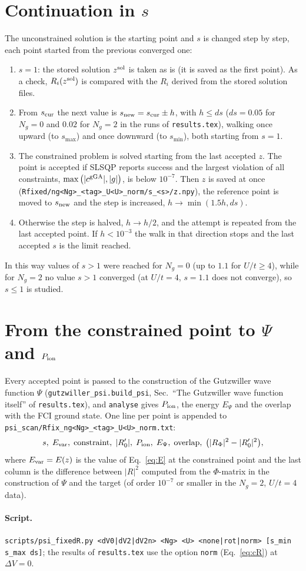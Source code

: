 \documentclass[11pt]{article}
\newcommand{\Ng}{N_g}
\newcommand{\dV}{\Delta V}
\begin{document}
\section{Continuation in $s$}
The unconstrained solution is the starting point and $s$ is changed step by step, each point started from the previous converged one:
\begin{enumerate}[leftmargin=1.5em,itemsep=1pt]
\item $s=1$: the stored solution $z^{\rm sol}$ is taken as is (it is saved as the first point). As a check, $R_i(z^{\rm sol})$ is compared with the $R_i$ derived from the stored solution files.
\item From $s_{\rm cur}$ the next value is $s_{\rm new}=s_{\rm cur}\pm h$, with $h\le ds$ ($ds=0.05$ for $\Ng=0$ and $0.02$ for $\Ng=2$ in the runs of \texttt{results.tex}), walking once upward (to $s_{\max}$) and once downward (to $s_{\min}$), both starting from $s=1$.
\item The constrained problem is solved starting from the last accepted $z$. The point is accepted if SLSQP reports success and the largest violation of all constraints, $\max\big(|c^{\rm gGA}|,|g|\big)$, is below $10^{-7}$. Then $z$ is saved at once (\texttt{Rfixed/ng<Ng>\_<tag>\_U<U>\_norm/s\_<s>/z.npy}), the reference point is moved to $s_{\rm new}$ and the step is increased, $h\to\min(1.5h,ds)$.
\item Otherwise the step is halved, $h\to h/2$, and the attempt is repeated from the last accepted point. If $h<10^{-3}$ the walk in that direction stops and the last accepted $s$ is the limit reached.
\end{enumerate}
In this way values of $s>1$ were reached for $\Ng=0$ (up to $1.1$ for $U/t\ge4$), while for $\Ng=2$ no value $s>1$ converged (at $U/t=4$, $s=1.1$ does not converge), so $s\le1$ is studied.

\section{From the constrained point to $\Psi$ and $P_{\rm ion}$}
Every accepted point is passed to the construction of the Gutzwiller wave function $\Psi$ (\texttt{gutzwiller\_psi.build\_psi}, Sec.~``The Gutzwiller wave function itself'' of \texttt{results.tex}), and \texttt{analyse} gives $P_{\rm ion}$, the energy $E_\Psi$ and the overlap with the FCI ground state. One line per point is appended to \texttt{psi\_scan/Rfix\_ng<Ng>\_<tag>\_U<U>\_norm.txt}:
\[
s,\;E_{\rm var},\;\text{constraint},\;|R'_0|,\;P_{\rm ion},\;E_\Psi,\;\text{overlap},\;\big(|R_\Phi|^2-|R'_0|^2\big),
\]
where $E_{\rm var}=E(z)$ is the value of Eq.~\eqref{eq:E} at the constrained point and the last column is the difference between $|R|^2$ computed from the $\Phi$-matrix in the construction of $\Psi$ and the target (of order $10^{-7}$ or smaller in the $\Ng=2$, $U/t=4$ data).

\paragraph{Script.} \texttt{scripts/psi\_fixedR.py <dV0|dV2|dV2n> <Ng> <U> <none|rot|norm> [s\_min s\_max ds]}; the results of \texttt{results.tex} use the option \texttt{norm} (Eq.~\eqref{eq:cR}) at $\dV=0$.
\end{document}
